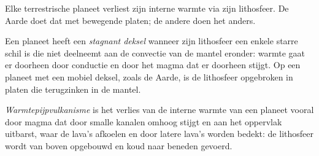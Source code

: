 Elke terrestrische planeet verliest zijn interne warmte via zijn lithosfeer.
De Aarde doet dat met bewegende platen; de andere doen het anders.

\begin{definition}\label{def:b3:planetary-interiors-surfaces:stagnant-lid}
Een planeet heeft een \emph{stagnant deksel} wanneer zijn lithosfeer een
enkele starre schil is die niet deelneemt aan de convectie van de
mantel eronder: warmte gaat er doorheen door conductie en door het magma dat er doorheen stijgt.
Op een planeet met een mobiel deksel, zoals de Aarde, is de lithosfeer
opgebroken in platen die terugzinken in de mantel.
\end{definition}

\begin{definition}[Warmtepijpvulkanisme]\label{def:b3:planetary-interiors-surfaces:heat-pipe}
\emph{Warmtepijpvulkanisme} is het verlies van de interne warmte van een
planeet vooral door magma dat door smalle kanalen omhoog stijgt en aan het
oppervlak uitbarst, waar de lava's afkoelen en door latere lava's worden bedekt:
de lithosfeer wordt van boven opgebouwd en koud naar beneden gevoerd.
\end{definition}

